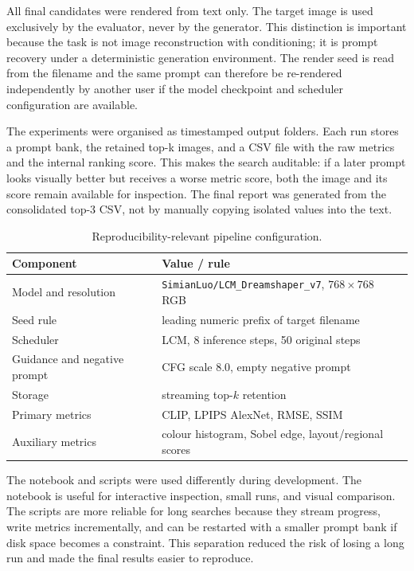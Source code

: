 \documentclass[runningheads]{llncs}
\newcommand{\modelname}{\texttt{SimianLuo/LCM\_Dreamshaper\_v7}}
\begin{document}
All final candidates were rendered from text only. The target image is used exclusively by the evaluator, never by the generator. This distinction is important because the task is not image reconstruction with conditioning; it is prompt recovery under a deterministic generation environment. The render seed is read from the filename and the same prompt can therefore be re-rendered independently by another user if the model checkpoint and scheduler configuration are available.

The experiments were organised as timestamped output folders. Each run stores a prompt bank, the retained top-k images, and a CSV file with the raw metrics and the internal ranking score. This makes the search auditable: if a later prompt looks visually better but receives a worse metric score, both the image and its score remain available for inspection. The final report was generated from the consolidated top-3 CSV, not by manually copying isolated values into the text.

\begin{table}[t]
\centering
\caption{Reproducibility-relevant pipeline configuration.}
\label{tab:repro}
\footnotesize
\setlength{\tabcolsep}{10pt}
\begin{tabular}{ll}
\toprule
Component & Value / rule \\
\midrule
Model and resolution & \modelname, $768\times768$ RGB \\
Seed rule & leading numeric prefix of target filename \\
Scheduler & LCM, 8 inference steps, 50 original steps \\
Guidance and negative prompt & CFG scale 8.0, empty negative prompt \\
Storage & streaming top-$k$ retention \\
Primary metrics & CLIP, LPIPS AlexNet, RMSE, SSIM \\
Auxiliary metrics & colour histogram, Sobel edge, layout/regional scores \\
\bottomrule
\end{tabular}
\end{table}

The notebook and scripts were used differently during development. The notebook is useful for interactive inspection, small runs, and visual comparison. The scripts are more reliable for long searches because they stream progress, write metrics incrementally, and can be restarted with a smaller prompt bank if disk space becomes a constraint. This separation reduced the risk of losing a long run and made the final results easier to reproduce.
\end{document}
